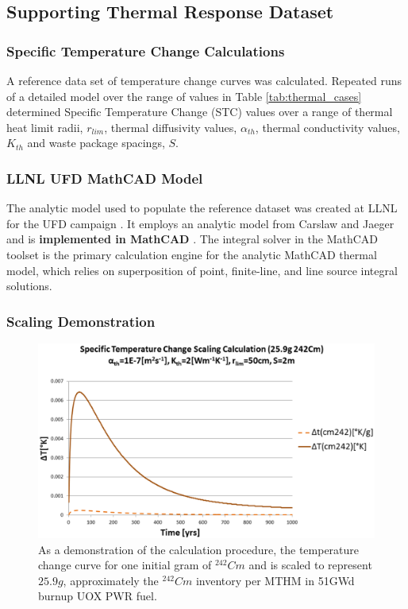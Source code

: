 \subsection{Supporting Thermal Response Dataset}
\begin{frame}[ctb!]
\frametitle{Specific Temperature Change Calculations}
\footnotesize{A reference data set of temperature change curves was calculated. 
Repeated runs of a detailed model over the range of values in Table 
\ref{tab:thermal_cases} determined Specific Temperature Change (STC) values over a range of thermal 
heat limit radii, $r_{lim}$, thermal diffusivity values, $\alpha_{th}$,
thermal conductivity values, $K_{th}$ and waste package spacings, $S$.


}
\end{frame}


\begin{frame}[ctb!]
\frametitle{LLNL UFD MathCAD Model}
\footnotesize{
The analytic model used to populate the reference dataset was created at 
LLNL for the UFD campaign \cite{hardin_generic_2011, 
greenberg_investigations_2012, greenberg_application_2012}. It employs an 
analytic model from Carslaw and Jaeger and is \textbf{implemented in MathCAD}
\cite{carslaw_conduction_1959, ptc_mathcad_2010}.  The integral solver in the 
MathCAD toolset is the primary calculation engine for the analytic MathCAD 
thermal model, which relies on superposition of point, finite-line, and line 
source integral solutions.  
}
\end{frame}



\begin{frame}[ctb!]
\frametitle{Scaling Demonstration}
\footnotesize{

\begin{figure}[h!]
\begin{center}
\includegraphics[width=\columnwidth]{./images/CmScaling.eps}
\end{center}
\caption{As a demonstration of the calculation procedure, the temperature change 
  curve for one initial gram of $^{242}Cm$ and is scaled to represent $25.9g$, 
  approximately the $^{242}Cm$ inventory per MTHM in 51GWd burnup UOX PWR fuel. }
\label{fig:CmScaling}
\end{figure}
}
\end{frame}

